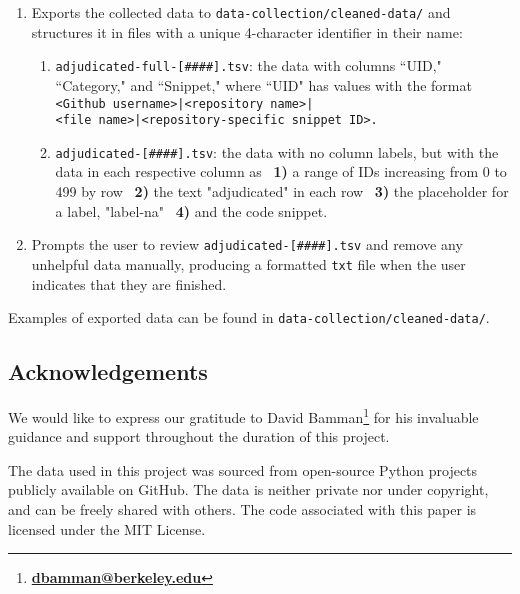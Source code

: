 \documentclass[11pt]{article}
\begin{document}
\begin{enumerate}[label=\alph*.]
    \item Exports the collected data to \texttt{data-collection/cleaned-data/} and structures it in files with a unique 4-character identifier in their name:

    \vspace{-2.5mm}
    
    \begin{enumerate}[label=\roman*.]
        \item \texttt{adjudicated-full-[\#\#\#\#].tsv}: the data with columns ``UID," ``Category," and ``Snippet," where ``UID" has values with the format \texttt{<Github username>|<repository name>| \\ <file name>|<repository-specific snippet ID>.}
        \item \texttt{adjudicated-[\#\#\#\#].tsv}: the data with no column labels, but with the data in each respective column as \ \textbf{1)} a range of IDs increasing from 0 to 499 by row \ \textbf{2)} the text "adjudicated" in each row \ \textbf{3)} the placeholder for a label, "label-na" \ \textbf{4)} and the code snippet. 
    \end{enumerate}

    \vspace{-2.5mm}

    \item Prompts the user to review \texttt{adjudicated-[\#\#\#\#].tsv} and remove any unhelpful data manually, producing a formatted \texttt{txt} file when the user indicates that they are finished.
\end{enumerate}

Examples of exported data can be found in  \texttt{data-collection/cleaned-data/}.

\subsection{Acknowledgements}
We would like to express our gratitude to David 
Bamman\footnote{\href{mailto:dbamman@berkeley.edu}{\textbf{dbamman@berkeley.edu}}} for his invaluable guidance and support throughout the duration of this project.

The data used in this project was sourced from open-source Python projects publicly available on GitHub. The data is neither private nor under copyright, and can be freely shared with others. The code associated with this paper is licensed under the MIT License.
\end{document}
